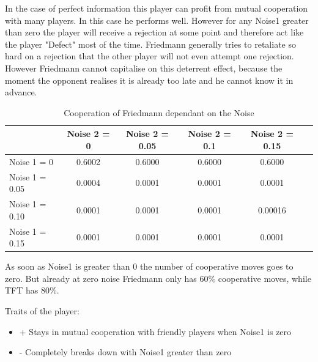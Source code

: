 \documentclass[11pt,twoside]{article}
\begin{document}
In the case of perfect information this player can profit from mutual cooperation with many players. In this case he performs well. However for any Noise1 greater than zero the player will receive a rejection at some point and therefore act like the player "Defect" most of the time. Friedmann generally tries to retaliate so hard on a rejection that the other player will not even attempt one rejection. However Friedmann cannot capitalise on this deterrent effect, because the moment the opponent realises it is already too late and he cannot know it in advance.

\begin{table}[h]
 \begin{center}
\caption{Cooperation of Friedmann dependant on the Noise} \vspace{3mm}
\begin{tabular}{|l|c|c|c|c|c|}
\hline
   	& Noise 2 = 0 & Noise 2 = 0.05& Noise 2 = 0.1& Noise 2 = 0.15 \\
  \hline
  Noise 1 = 0 	& 0.6002&    0.6000&    0.6000 &   0.6000 \\
 \hline
  Noise 1 = 0.05	 & 0.0004&    0.0001 &   0.0001  &  0.0001 \\
 \hline
  Noise 1 = 0.10 	& 0.0001  &  0.0001&    0.0001 &   0.00016 \\
 \hline
  Noise 1 = 0.15 	& 0.0001  &  0.0001  &  0.0001  &  0.0001 \\
 \hline
\end{tabular}
 \end{center}
\end{table}

As soon as Noise1 is greater than 0 the number of cooperative moves goes to zero. But already at zero noise Friedmann only has 60\% cooperative moves, while TFT has 80\%.


Traits of the player:

\renewcommand{\labelitemi}{}

\begin{itemize}
	\item + Stays in mutual cooperation with friendly players when Noise1 is zero
	\item - Completely breaks down with Noise1 greater than zero
\end{itemize}
\renewcommand{\labelitemi}{$\bullet$}

\newpage
\end{document}
